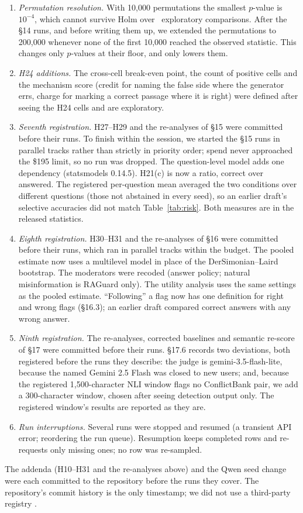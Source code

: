 \begin{enumerate}[leftmargin=*,itemsep=1pt,topsep=2pt]
parser unwraps paired tags (\texttt{<answer>X</answer>}), a format no earlier result contained.
\item \emph{Permutation resolution.} With 10,000 permutations the smallest $p$-value is $10^{-4}$, which cannot
survive Holm over \nExploratory\ exploratory comparisons. After the \S14 runs, and before writing them up, we
extended the permutations to 200,000 whenever none of the first 10,000 reached the observed statistic. This changes
only $p$-values at their floor, and only lowers them.
\item \emph{H24 additions.} The cross-cell break-even point, the count of positive cells and the mechanism score
(credit for naming the false side where the generator errs, charge for marking a correct passage where it is right)
were defined after seeing the H24 cells and are exploratory.
\item \emph{Seventh registration.} H27--H29 and the re-analyses of \S15 were committed before their runs. To finish
within the session, we started the \S15 runs in parallel tracks rather than strictly in priority order; spend never
approached the \$195 limit, so no run was dropped. The question-level model adds one dependency (statsmodels 0.14.5).
H21(c) is now a ratio, correct over answered. The registered per-question mean averaged the two conditions
over different questions (those not abstained in every seed), so an earlier draft's selective accuracies did
not match Table~\ref{tab:risk}. Both measures are in the released statistics.
\item \emph{Eighth registration.} H30--H31 and the re-analyses of \S16 were committed before their runs, which
ran in parallel tracks within the budget. The pooled estimate now uses a multilevel model in place of the
DerSimonian--Laird bootstrap. The moderators were recoded (answer policy; natural misinformation is RAGuard only).
The utility analysis uses the same settings as the pooled estimate. ``Following'' a flag now has one definition for
right and wrong flags (\S16.3); an earlier draft compared correct answers with any wrong answer.
\item \emph{Ninth registration.} The re-analyses, corrected baselines and semantic re-score of \S17 were committed
before their runs. \S17.6 records two deviations, both registered before the runs they describe: the judge is
gemini-3.5-flash-lite, because the named Gemini 2.5 Flash was closed to new users; and, because the registered
1,500-character NLI window flags no ConflictBank pair, we add a 300-character window, chosen after seeing
detection output only. The registered window's results are reported as they are.
\item \emph{Run interruptions.} Several runs were stopped and resumed (a transient API error; reordering the run
queue). Resumption keeps completed rows and re-requests only missing ones; no row was re-sampled.
\end{enumerate}
The addenda (H10--H31 and the re-analyses above) and the Qwen seed change were each committed to the repository before
the runs they cover. The repository's commit history is the only timestamp; we did not use a third-party registry
\citep{vanmiltenburg2021preregistering}.

